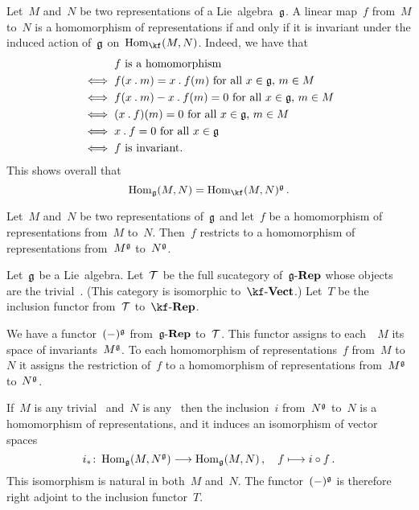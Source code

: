 \begin{remark}
  \label{homomorphisms of representations as invariants}
  Let~$M$ and~$N$ be two representations of a Lie~algebra~$\glie$.
  A linear map~$f$ from~$M$ to~$N$ is a homomorphism of representations if and only if it is invariant under the induced action of~$\glie$ on~$\Hom_{\kf}(M,N)$.
  Indeed, we have that
  \begin{align*}
        {}& \text{$f$ is a homomorphism}  \\
    \iff{}& \text{$f(x \mathbin{.} m) = x \mathbin{.} f(m)$ for all~$x \in \mathfrak{g}$,~$m \in M$}  \\
    \iff{}& \text{$f(x \mathbin{.} m) - x \mathbin{.} f(m) = 0$ for all~$x \in \mathfrak{g}$,~$m \in M$}  \\
    \iff{}& \text{$(x \mathbin{.} f)(m) = 0$ for all~$x \in \mathfrak{g}$,~$m \in M$} \\
    \iff{}& \text{$x \mathbin{.} f = 0$ for all~$x \in \mathfrak{g}$}  \\
    \iff{}& \text{$f$ is invariant.}
  \end{align*}
  This shows overall that
  \[
    \Hom_{\glie}(M,N)
    =
    \Hom_{\kf}(M,N)^{\glie} \,.
  \]
\end{remark}


\begin{proposition} 
  Let~$M$ and~$N$ be two representations of~$\glie$ and let~$f$ be a homomorphism of representations from~$M$ to~$N$.
  Then~$f$ restricts to a homomorphism of representations from~$M^{\mathfrak{g}}$ to~$N^{\mathfrak{g}}$.
\end{proposition}


\begin{remark}
  \label{invariants are right adjoint}
  Let~$\glie$ be a Lie~algebra.
  Let~$\mathcal{T}$ be the full sucategory of~$\mathfrak{g}\text{-}\mathbf{Rep}$ whose objects are the trivial~\representations{$\glie$}.
  (This category is isomorphic to~$\cVect{\kf}$.)
  Let~$T$ be the inclusion functor from~$\mathcal{T}$ to~$\cRep{\kf}$.

  We have a functor~$(-)^{\mathfrak{g}}$ from~$\mathfrak{g}\text{-}\mathbf{Rep}$ to~$\mathcal{T}$.
  This functor assigns to each~\representation{$\glie$}~$M$ its space of invariants~$M^{\mathfrak{g}}$.
  To each homomorphism of representations~$f$ from~$M$ to~$N$ it assigns the restriction of~$f$ to a homomorphism of representations from~$M^{\mathfrak{g}}$ to~$N^{\mathfrak{g}}$.

  If~$M$ is any trivial~\representation{$\glie$} and~$N$ is any~\representation{$\glie$} then the inclusion~$i$ from~$N^{\mathfrak{g}}$ to~$N$ is a homomorphism of representations, and it induces an isomorphism of vector spaces
  \[
    i_*
    \colon
    \Hom_{\glie}(M, N^{\glie})
    \to
    \Hom_{\glie}(M, N) \,,
    \quad
    f
    \mapsto
    i \circ f \,.
  \]
  This isomorphism is natural in both~$M$ and~$N$.
  The functor~$(-)^{\mathfrak{g}}$ is therefore right adjoint to the inclusion functor~$T$.
\end{remark}


